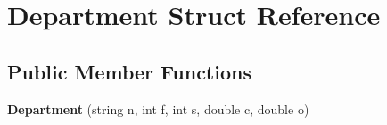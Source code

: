 \hypertarget{struct_department}{\section{Department Struct Reference}
\label{struct_department}
}
\subsection*{Public Member Functions}
\begin{DoxyCompactItemize}
\item 
\hypertarget{struct_department_a11775eeaeaeefdffa169a89621f59dbb}{{\bfseries Department} (string n, int f, int s, double c, double o)}\label{struct_department_a11775eeaeaeefdffa169a89621f59dbb}

\end{DoxyCompactItemize}
